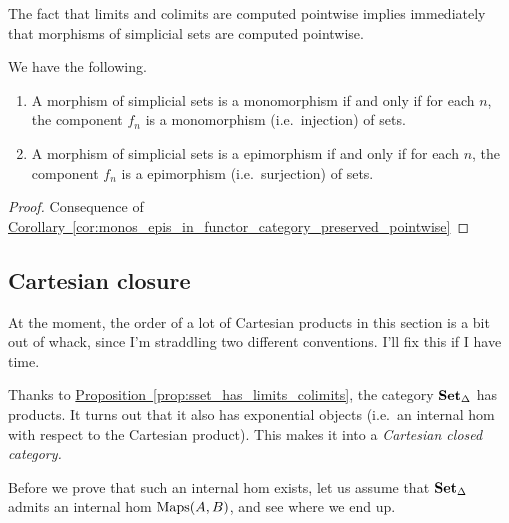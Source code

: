\documentclass[main.tex]{subfiles}
\begin{document}
The fact that limits and colimits are computed pointwise implies immediately that morphisms of simplicial sets are computed pointwise.
\begin{lemma}
  \label{lemma:properties_of_morphisms_of_simplicial_sets}
  We have the following.
  \begin{enumerate}
    \item A morphism of simplicial sets is a monomorphism if and only if for each $n$, the component $f_{n}$ is a monomorphism (i.e.\ injection) of sets.

    \item A morphism of simplicial sets is a epimorphism if and only if for each $n$, the component $f_{n}$ is a epimorphism (i.e.\ surjection) of sets.
  \end{enumerate}
\end{lemma}
\begin{proof}
  Consequence of \hyperref[cor:monos_epis_in_functor_category_preserved_pointwise]{Corollary~\ref*{cor:monos_epis_in_functor_category_preserved_pointwise}}
\end{proof}

\subsection{Cartesian closure}
\label{ssc:cartesian_closure}

\begin{note}
  At the moment, the order of a lot of Cartesian products in this section is a bit out of whack, since I'm straddling two different conventions. I'll fix this if I have time.
\end{note}

Thanks to \hyperref[prop:sset_has_limits_colimits]{Proposition~\ref*{prop:sset_has_limits_colimits}}, the category $\operatorname{\mathbf{Set}_{\Delta}}$ has products. It turns out that it also has exponential objects (i.e.\ an internal hom with respect to the Cartesian product). This makes it into a \emph{Cartesian closed category.}

Before we prove that such an internal hom exists, let us assume that $\operatorname{\mathbf{Set}_{\Delta}}$ admits an internal hom $\operatorname{Maps}(A, B)$, and see where we end up.
\end{document}
